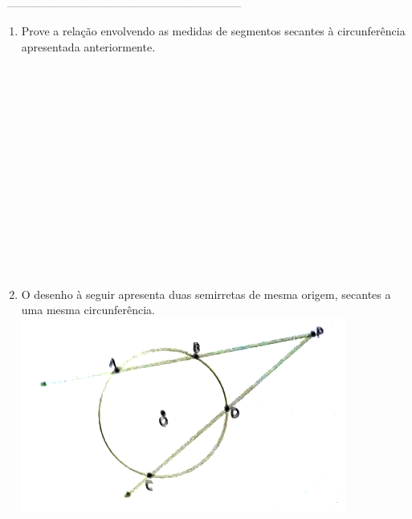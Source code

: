 \documentclass[a4paper,14pt]{article}
\begin{document}
\begin{multicols}{2}
    	
    	\noindent\textsubscript{~---------------------------------------------------------------------------}
    	\begin{enumerate}
    		\item Prove a relação envolvendo as medidas de segmentos secantes à circunferência apresentada anteriormente. \\\\\\\\\\\\\\\\\\\\\\\\\\\\\\
    		\item O desenho à seguir apresenta duas semirretas de mesma origem, secantes a uma mesma circunferência.
    		\includegraphics[width=1\linewidth]{imagens_8FMA109/imagem2}
    		

\end{enumerate}
\end{multicols}
\end{document}
